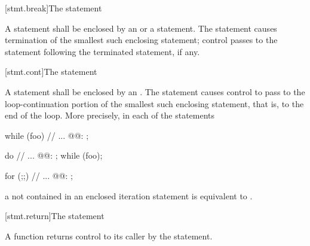 [stmt.break]{The  statement}%

\pnum
A  statement shall be enclosed by
%
%
an  or
a  statement.
The  statement causes
termination of the smallest such enclosing statement;
control passes to the statement following the
terminated statement, if any.

[stmt.cont]{The  statement}%

\pnum
A 
statement shall be enclosed by an
%
.
The  statement
causes control to pass to the loop-continuation portion of the
smallest such enclosing statement, that is, to the end
of the loop. More precisely, in each of the statements

\begin{minipage}{.30\hsize}
\begin{codeblock}
while (foo) {
  {
    // ...
  }
@@: ;
}
\end{codeblock}
\end{minipage}
\begin{minipage}{.30\hsize}
\begin{codeblock}
do {
  {
    // ...
  }
@@: ;
} while (foo);
\end{codeblock}
\end{minipage}
\begin{minipage}{.30\hsize}
\begin{codeblock}
for (;;) {
  {
    // ...
  }
@@: ;
}
\end{codeblock}
\end{minipage}

a  not contained in an enclosed iteration statement is
equivalent to  .

[stmt.return]{The  statement}%
%
%

\pnum
A function returns control to its caller by the  statement.

